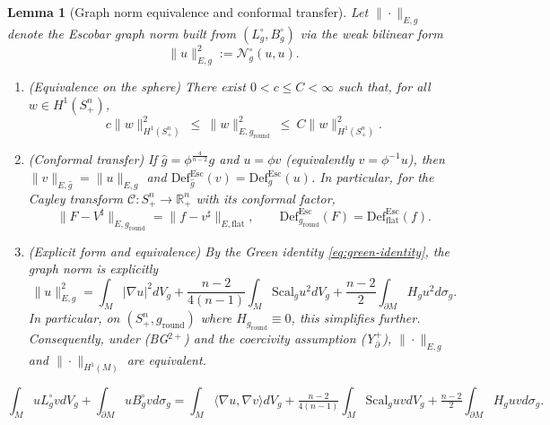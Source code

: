 \documentclass[10pt,a4paper]{amsart}
\newtheorem{lemma}{Lemma}
\newcommand{\Def}{\mathrm{Def}}
\newcommand{\R}{\mathbb{R}}
\newcommand{\Scal}{\mathrm{Scal}}
\begin{document}
\begin{lemma}[Graph norm equivalence and conformal transfer]\label{lem:graph-norm}
Let $\|\cdot\|_{E,g}$ denote the Escobar graph norm built from $(L_g^{\circ},B_g^{\circ})$ via the weak bilinear form
\[
\|u\|_{E,g}^2:=\mathcal N^\circ_g(u,u).
\]
\begin{enumerate}[label=(\alph*)]
\item (\emph{Equivalence on the sphere}) There exist $0<c\le C<\infty$ such that, for all $w\in H^1(S^n_+)$,
\[
c\|w\|_{H^1(S^n_+)}^2\ \le\ \|w\|_{E,g_{\mathrm{round}}}^2\ \le\ C\|w\|_{H^1(S^n_+)}^2.
\]
\item (\emph{Conformal transfer}) If $\widehat g=\phi^{\frac{4}{n-2}}g$ and $u=\phi v$ (equivalently $v=\phi^{-1}u$), then $\|v\|_{E,\widehat g}=\|u\|_{E,g}$ and $\Def^{\mathrm{Esc}}_{\widehat g}(v)=\Def^{\mathrm{Esc}}_{g}(u)$.
 In particular, for the Cayley transform $\mathcal C:S^n_+\to\R^n_+$ with its conformal factor,
\[
\|F-V^\sharp\|_{E,g_{\mathrm{round}}} = \|f-v^\sharp\|_{E,\mathrm{flat}},
\qquad \Def^{\mathrm{Esc}}_{g_{\mathrm{round}}}(F)=\Def^{\mathrm{Esc}}_{\mathrm{flat}}(f).
\]
\item (\emph{Explicit form and equivalence}) By the Green identity \eqref{eq:green-identity}, the graph norm is explicitly
\begin{equation}\label{eq:graph-norm-explicit}
\|u\|_{E,g}^2 = \int_M |\nabla u|^2dV_g + \frac{n-2}{4(n-1)}\int_M \Scal_gu^2dV_g + \frac{n-2}{2}\int_{\partial M} H_gu^2d\sigma_g.
\end{equation}
In particular, on $(S^n_+,g_{\mathrm{round}})$ where $H_{g_{\mathrm{round}}}\equiv 0$, this simplifies further.
Consequently, under \textup{(BG$^{2+}$)} and the coercivity assumption \textup{(Y$^+_{\partial}$)}, $\|\cdot\|_{E,g}$ and $\|\cdot\|_{H^1(M)}$ are equivalent.
\end{enumerate}
\end{lemma}

\begin{equation}\label{eq:green-identity}
\int_M uL_g^{\circ} vdV_g+\int_{\partial M} uB_g^{\circ} vd\sigma_g
= \int_M \langle \nabla u,\nabla v\rangle dV_g
 + \tfrac{n-2}{4(n-1)}\int_M \Scal_gu vdV_g
 + \tfrac{n-2}{2}\int_{\partial M} H_gu vd\sigma_g.
\end{equation}
\end{document}
